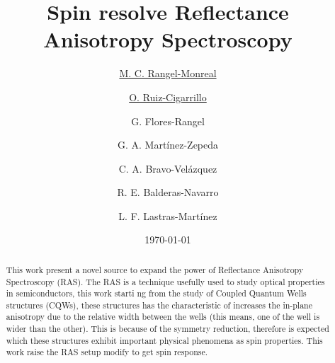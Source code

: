 \documentclass[reprint,aps,prb,citeautoscript,altaffilletter]{revtex4-2}
\begin{document}
	
	
	\title{Spin resolve Reflectance Anisotropy Spectroscopy }
	\author{\underline{M. C. Rangel-Monreal}}
	\author{\underline{O. Ruiz-Cigarrillo}}
	\author{G. Flores-Rangel}
	\author{G. A. Mart\'inez-Zepeda }
	\author{C. A. Bravo-Vel\'azquez}
	\author{R. E. Balderas-Navarro}
	\author{L. F. Lastras-Mart\'inez}
	
	\date{\today}
	
	\begin{abstract}
		This work present a novel source to expand the power of Reflectance Anisotropy Spectroscopy (RAS). The RAS is a technique usefully used to study optical properties in semiconductors, this work starti
		ng from the study of Coupled Quantum Wells structures (CQWs), these structures has the characteristic of  increases the in-plane anisotropy due to the relative width between the wells (this means, one of the well is wider than the other). This is because of the symmetry reduction, therefore is expected which these structures exhibit important physical phenomena as spin properties. This work raise the RAS setup modify to get spin response.   
	\end{abstract}
	
	\maketitle
	

	
%
%
	
\end{document}
